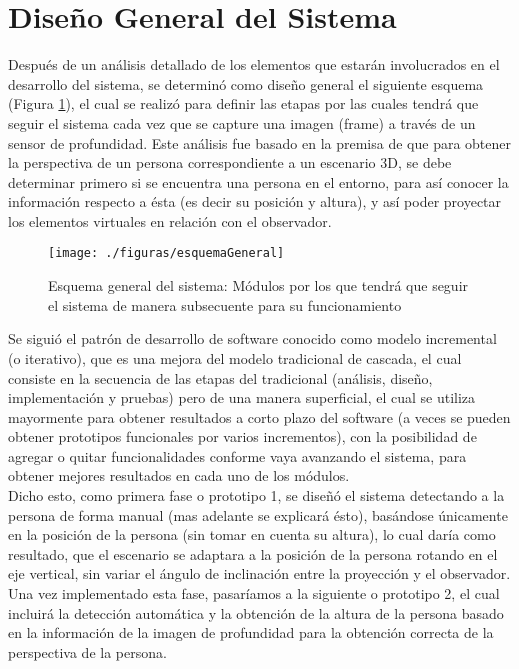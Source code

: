 \documentclass[a4paper,openright,12pt]{report}
\begin{document}
\section{Diseño General del Sistema}
Después de un análisis detallado de los elementos que estarán involucrados en el desarrollo del sistema, se determinó como diseño general el siguiente esquema (Figura \ref{fig:esquemaGeneral}), el cual se realizó para definir las etapas por las cuales tendrá que seguir el sistema cada vez que se capture una imagen (frame) a través de un sensor de profundidad. Este análisis fue basado en la premisa de que para obtener la perspectiva de un persona correspondiente a un escenario 3D, se debe determinar primero si se encuentra una persona en el entorno, para así conocer la información respecto a ésta (es decir su posición y altura), y así poder proyectar los elementos virtuales en relación con el observador.\\
\begin{figure}[tbh]
	\centering
	\texttt{[image: ./figuras/esquemaGeneral]}
	\caption[Esquema general del sistema]{Esquema general del sistema: Módulos por los que tendrá que seguir el sistema de manera subsecuente  para su funcionamiento} \label{fig:esquemaGeneral}
\end{figure}
Se siguió el patrón de desarrollo de software conocido como modelo incremental (o iterativo), que es una mejora del modelo tradicional de cascada, el cual consiste en la secuencia de las etapas del tradicional (análisis, diseño,  implementación y pruebas) pero de una manera superficial, el cual se utiliza mayormente para obtener resultados a corto plazo del software (a veces se pueden obtener prototipos funcionales por varios incrementos), con la posibilidad de agregar o quitar funcionalidades conforme vaya avanzando el sistema, para obtener mejores resultados en cada uno de los módulos.\\ Dicho esto, como primera fase o prototipo 1, se diseñó el sistema detectando a la persona de forma manual (mas adelante se explicará ésto), basándose únicamente en la posición de la persona (sin tomar en cuenta su altura), lo cual daría como resultado, que el escenario se adaptara a la posición de la persona rotando en el eje vertical, sin variar el ángulo de inclinación entre la proyección y el observador.\\ Una vez implementado esta fase, pasaríamos a la siguiente o prototipo 2, el cual incluirá la detección automática y la obtención de la altura de la persona basado en la información de la imagen de profundidad para la obtención correcta de la perspectiva de la persona.
\end{document}
